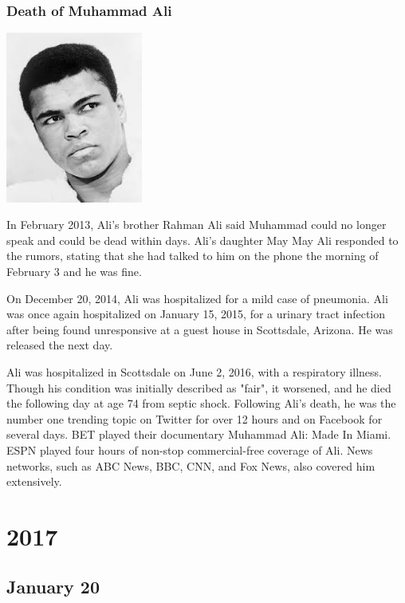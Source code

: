 \documentclass[11pt]{report}
\begin{document}
\subsection{Death of Muhammad Ali}
\vspace{2mm}\begin{center}\includegraphics[width=4.5cm]{./img/muhammadAli.jpg}\end{center}
In February 2013, Ali's brother Rahman Ali said Muhammad could no longer speak and could be dead within days. Ali's daughter May May Ali responded to the rumors, stating that she had talked to him on the phone the morning of February 3 and he was fine.

On December 20, 2014, Ali was hospitalized for a mild case of pneumonia. Ali was once again hospitalized on January 15, 2015, for a urinary tract infection after being found unresponsive at a guest house in Scottsdale, Arizona. He was released the next day.

Ali was hospitalized in Scottsdale on June 2, 2016, with a respiratory illness. Though his condition was initially described as "fair", it worsened, and he died the following day at age 74 from septic shock. Following Ali's death, he was the number one trending topic on Twitter for over 12 hours and on Facebook for several days. BET played their documentary Muhammad Ali: Made In Miami. ESPN played four hours of non-stop commercial-free coverage of Ali. News networks, such as ABC News, BBC, CNN, and Fox News, also covered him extensively.

\chapter{2017}
\section{January 20}
\end{document}
